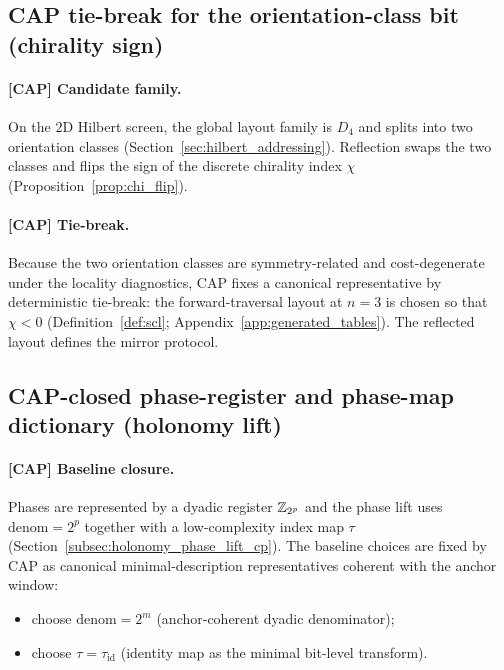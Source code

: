 \subsection{CAP tie-break for the orientation-class bit (chirality sign)}
\label{subsec:tick_cap_orientation_bit}

\paragraph{[CAP] Candidate family.}
On the $2$D Hilbert screen, the global layout family is $D_4$ and splits into two orientation classes (Section~\ref{sec:hilbert_addressing}).
Reflection swaps the two classes and flips the sign of the discrete chirality index $\chi$ (Proposition~\ref{prop:chi_flip}).

\paragraph{[CAP] Tie-break.}
Because the two orientation classes are symmetry-related and cost-degenerate under the locality diagnostics, CAP fixes a canonical representative by deterministic tie-break: the forward-traversal layout at $n=3$ is chosen so that $\chi<0$ (Definition~\ref{def:scl}; Appendix~\ref{app:generated_tables}).
The reflected layout defines the mirror protocol.

\subsection{CAP-closed phase-register and phase-map dictionary (holonomy lift)}
\label{subsec:tick_cap_phase_register}

\paragraph{[CAP] Baseline closure.}
Phases are represented by a dyadic register $\mathbb{Z}_{2^p}$ and the phase lift uses $\mathrm{denom}=2^p$ together with a low-complexity index map $\tau$ (Section~\ref{subsec:holonomy_phase_lift_cp}).
The baseline choices are fixed by CAP as canonical minimal-description representatives coherent with the anchor window:
\begin{itemize}
\item choose $\mathrm{denom}=2^m$ (anchor-coherent dyadic denominator);
\item choose $\tau=\tau_{\mathrm{id}}$ (identity map as the minimal bit-level transform).
\end{itemize}

